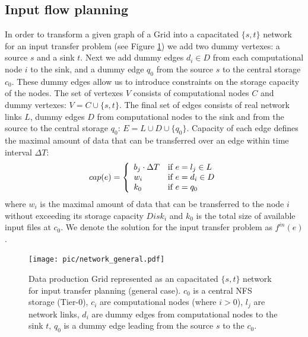 \documentclass{svjour3}                     %
\begin{document}
\subsection{Input flow planning}

In order to transform a given graph of a Grid into a capacitated $\{s,t\}$
network for an input transfer problem (see Figure \ref{network_general}) we add two dummy vertexes: a source $s$
and a sink $t$. Next we add  dummy edges $d_{i} \in D$ from each computational
node $i$ to the sink, and a dummy edge $q_{0}$ from the source $s$ to the
central storage $c_{0}$. These dummy edges allow us to introduce constraints
on the storage capacity of the nodes. The set of vertexes $V$ consists of
computational nodes $C$ and dummy vertexes: $V= C \cup \{s,t\}$. The final set
of edges consists of real network links $L$, dummy edges $D$ from
computational nodes to the sink and from the source to the central storage
$q_{0}$: $E= L \cup D \cup \{q_{0}\}$. Capacity of each edge defines the
maximal amount of data that can be transferred over an edge within time
interval $\Delta T$: 
%
\begin{equation} 
\label{edge_cap} 
cap(e) = \left\{
\begin{array}{l l} 
b_{j} \cdot \Delta T & \text{if }e = l_{j} \in L \\ w_{i} &
\text{if } e = d_{i} \in D\\ k_{0} & \text{if } e = q_{0} 
\end{array} \right.
\end{equation} 
%
where $w_{i}$ is the maximal amount of data that can be
transferred to the node $i$ without exceeding its storage capacity $Disk_{i}$
and $k_{0}$ is the total size of available input files at $c_{0}$. We denote
the solution for the input transfer problem as $f^{in}(e)$.
\begin{figure}
	\begin{center}
		\texttt{[image: pic/network\_general.pdf]}
	\end{center}
	\caption{Data production Grid represented as an capacitated $\{s,t\}$ network for input transfer planning (general case). $c_{0}$ is a central NFS storage (Tier-0), $c_{i}$ are computational nodes (where $i>0$), $l_{j}$ are network links, $d_{i}$ are dummy edges from computational nodes to the sink $t$, $q_{0}$ is a dummy edge leading from the source $s$ to the $c_{0}$. }
	\label{network_general}
\end{figure}  
\end{document}
